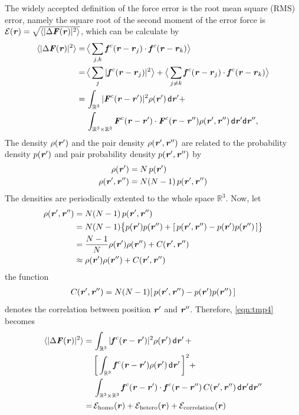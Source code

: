 \documentclass[aps,pre,preprint]{revtex4}
\renewcommand{\v}[1]{\textbf{\textit{#1}}}
\renewcommand{\d}[1]{\textsf{#1}}
\begin{document}
The widely accepted definition of the force error is the root mean
square (RMS) error, namely the square root of the second moment of the
error force is $\mathcal E(\v r) = \sqrt{\langle\vert\Delta\v F(\v
  r)\vert^2\rangle}$, which can be calculate by
\begin{align} \nonumber
  \langle\vert\Delta\v F(\v r)\vert^2\rangle
  =\,&
  \big\langle\sum_{j,k}\v f^c(\v r - \v r_j)\cdot\v f^c(\v r - \v r_k)\big\rangle \\ \nonumber
  =\,&
  \big\langle\sum_j\vert\v f^c(\v r - \v r_j)\vert^2\big\rangle +
  \big\langle\sum_{j\neq k}\v f^c(\v r - \v r_j)\cdot\v f^c(\v r - \v r_k)\big\rangle \\ \nonumber
  =\,&
  \int_{\mathbb R^3}\vert\v F^c(\v r - \v r')\vert^2\rho(\v r')\,\d d\v r'
  + \\\label{eqn:tmp4}
  \,&
  \int_{\mathbb R^3\times\mathbb R^3}\v F^c(\v r - \v r')\cdot\v F^c(\v r - \v r'')\rho(\v r', \v r'')\,\d d\v r'\d d\v r'',
\end{align}
The density $\rho(\v r')$ and the pair density $\rho(\v r', \v r'')$
are related to the probability density $p(\v r')$ and pair probability
density $p(\v r', \v r'')$ by
\begin{align}
  \rho(\v r') &= N\,p(\v r') \\
  \rho(\v r', \v r'') &= N(N-1)\,p(\v r', \v r'')
\end{align}
The densities are periodically extented to the whole space $\mathbb
R^3$.
Now, let
\begin{align} \nonumber
  \rho(\v r', \v r'')
  & = N (N-1) \,p(\v r', \v r'') \\\nonumber
  & = N (N-1) \big\{ p(\v r')p(\v r'') + [\,p(\v r', \v r'') -  p(\v r')p(\v r'')\,]\big\} \\\nonumber
  &= \frac{N-1}N \rho(\v r')\rho(\v r'') + C (\v r', \v r'')\\ \label{eqn:tmp7}
  &\approx \rho(\v r')\rho(\v r'') + C (\v r', \v r'')
\end{align}
the function
\begin{align}
C (\v r', \v r'') = N (N-1) [\,p(\v r', \v r'') -  p(\v r')p(\v r'')\,]
\end{align}
denotes the correlation between
position $\v r'$ and $\v r''$. Therefore, \eqref{eqn:tmp4} becomes
\begin{align} \nonumber
  \langle\vert\Delta\v F(\v r)\vert^2\rangle
  = &\,
  \int_{\mathbb R^3}\vert\v f^c(\v r - \v r')\vert^2\rho(\v r')\,\d d\v r' \,+ \\\nonumber
  &\,
  \bigg[\int_{\mathbb R^3}\v f^c(\v r - \v r')\rho(\v r')\,\d d\v r'\,\bigg]^2 + \\\nonumber
  &\,
  \int_{\mathbb R^3\times\mathbb R^3}\v f^c(\v r - \v r')\cdot\v f^c(\v r - \v r'')\,C(\v r', \v r'')\,\d d\v r'\d d\v r'' \\\label{eqn:tmp5}
  = &\,
  \mathcal E_{\textrm{homo}}(\v r) +
  \mathcal E_{\textrm{hetero}}(\v r) +
  \mathcal E_{\textrm{correlation}}(\v r)
\end{align}
\end{document}
